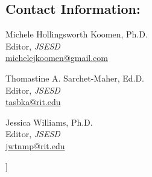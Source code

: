 \documentclass{sig-alternate} %
\begin{document}
\begin{large}
\begin{@twocolumnfalse}
\subsection*{Contact Information:}

Michele Hollingsworth Koomen, Ph.D.\\
Editor, \textit{JSESD}\\
\href{mailto:michelejkoomen@gmail.com}{michelejkoomen@gmail.com}

Thomastine A. Sarchet-Maher, Ed.D.\\
Editor, \textit{JSESD}\\
\href{mailto:tasbka@rit.edu}{tasbka@rit.edu}

Jessica Williams, Ph.D.\\
Editor, \textit{JSESD}\\
\href{mailto:jwtnmp@rit.edu}{jwtnmp@rit.edu}

\end{@twocolumnfalse}]

\end{large}
\end{document}
